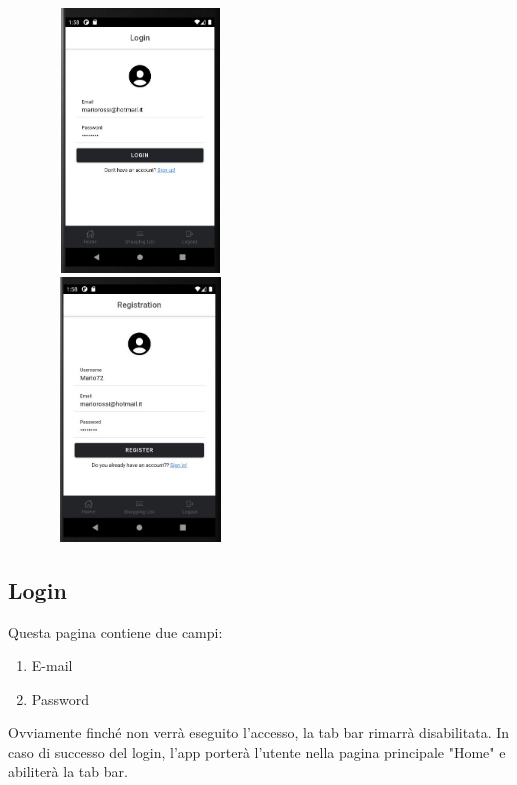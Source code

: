 \documentclass[11pt]{article}
\begin{document}
\begin{multicols}{2}
\begin{center}
\null \vfill
\includegraphics[width=7cm,height=7cm,keepaspectratio]{Login}
\null \vfill
\columnbreak
\null \vfill
\includegraphics[width=7cm,height=7cm,keepaspectratio]{Registration}
\null \vfill
\end{center}
\end{multicols}


\newpage

\subsection{Login}
Questa pagina contiene due campi:
\begin{enumerate}
\item E-mail
\item Password
\end{enumerate}



Ovviamente finché non verrà eseguito l'accesso, la tab bar rimarrà disabilitata. In caso di successo del login, l'app porterà l'utente nella pagina principale "Home" e abiliterà la tab bar.
\end{document}
